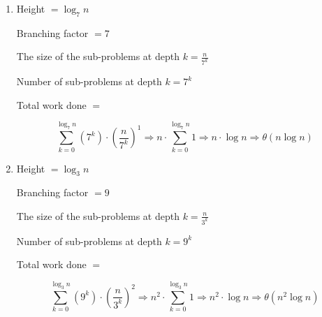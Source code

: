 \documentclass[letterpaper,11pt]{article}
\begin{document}
\begin{enumerate}[label=(\alph*)]
    \item Height $= \log_7 n$
    
    Branching factor $= 7$

    The size of the sub-problems at depth $k = \frac{n}{7^k}$

    Number of sub-problems at depth $k = 7^k$

    Total work done $=$ 
    
    \[ \sum_{k=0}^{\log_7 n} (7^k) \cdot (\frac{n}{7^k})^1
    \Rightarrow n \cdot \sum_{k=0}^{\log_7 n} 1
    \Rightarrow n \cdot \log n
    \Rightarrow \theta (n \log n) \]
    
    \item Height $= \log_3 n$
    
    Branching factor $= 9$

    The size of the sub-problems at depth $k = \frac{n}{3^k}$

    Number of sub-problems at depth $k = 9^k$

    Total work done $=$ 
    
    \[ \sum_{k=0}^{\log_3 n} (9^k) \cdot (\frac{n}{3^k})^2
    \Rightarrow n^2 \cdot \sum_{k=0}^{\log_3 n} 1
    \Rightarrow n^2 \cdot \log n
    \Rightarrow \theta (n^2 \log n) \]

\end{enumerate}
\end{document}
